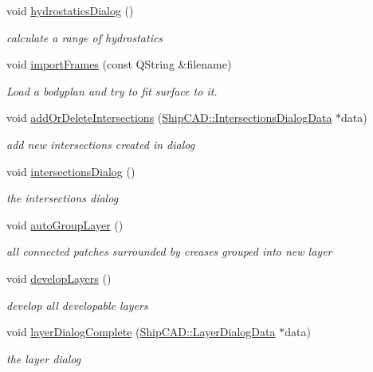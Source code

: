 \begin{DoxyCompactItemize}
void \hyperlink{classShipCAD_1_1Controller_af3cb8f74ad629b252e41d18dd4eafaf5}{hydrostatics\+Dialog} ()
\begin{DoxyCompactList}\small\item\em calculate a range of hydrostatics \end{DoxyCompactList}\item 
void \hyperlink{classShipCAD_1_1Controller_a48f50dda1f805bab3ad127f2051c6fa1}{import\+Frames} (const Q\+String \&filename)
\begin{DoxyCompactList}\small\item\em Load a bodyplan and try to fit surface to it. \end{DoxyCompactList}\item 
void \hyperlink{classShipCAD_1_1Controller_a55278e6857b17ee49ed484430071159b}{add\+Or\+Delete\+Intersections} (\hyperlink{structShipCAD_1_1IntersectionsDialogData}{Ship\+C\+A\+D\+::\+Intersections\+Dialog\+Data} $\ast$data)
\begin{DoxyCompactList}\small\item\em add new intersections created in dialog \end{DoxyCompactList}\item 
void \hyperlink{classShipCAD_1_1Controller_a807f729e06e1ea1dde775bed14857956}{intersections\+Dialog} ()
\begin{DoxyCompactList}\small\item\em the intersections dialog \end{DoxyCompactList}\item 
void \hyperlink{classShipCAD_1_1Controller_a72c34ce03882c0bb27603cb69af988a6}{auto\+Group\+Layer} ()
\begin{DoxyCompactList}\small\item\em all connected patches surrounded by creases grouped into new layer \end{DoxyCompactList}\item 
void \hyperlink{classShipCAD_1_1Controller_a3e7966e9726ba79f9978e691ce096964}{develop\+Layers} ()
\begin{DoxyCompactList}\small\item\em develop all developable layers \end{DoxyCompactList}\item 
void \hyperlink{classShipCAD_1_1Controller_abcbf0d12a0bbdbf62fd56e12e7dd466c}{layer\+Dialog\+Complete} (\hyperlink{structShipCAD_1_1LayerDialogData}{Ship\+C\+A\+D\+::\+Layer\+Dialog\+Data} $\ast$data)
\begin{DoxyCompactList}\small\item\em the layer dialog \end{DoxyCompactList}\item 

\end{DoxyCompactItemize}
